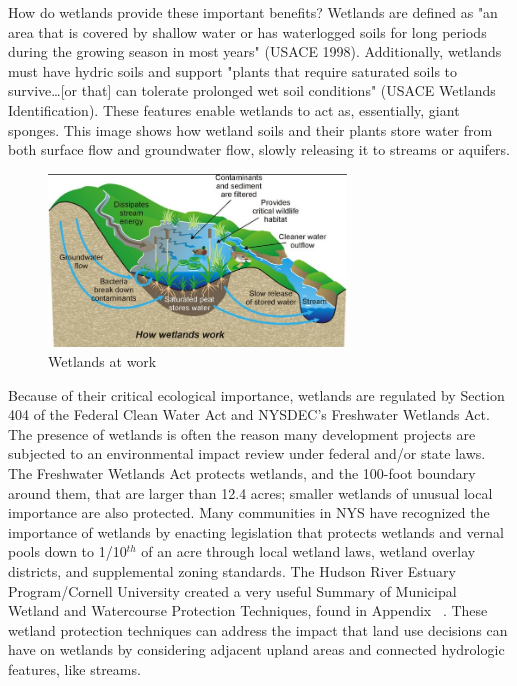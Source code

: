 How do wetlands provide these important benefits? Wetlands are defined as "an 
area that is covered by shallow water or has waterlogged soils for long periods 
during the growing season in most years" (USACE 1998). Additionally, wetlands 
must have hydric soils and support "plants that require saturated soils to 
survive\ldots [or that] can tolerate prolonged wet soil conditions" (USACE 
Wetlands Identification). These features enable wetlands to act as, 
essentially, giant sponges. This image shows how wetland soils and their plants 
store water from both surface flow and groundwater flow, slowly releasing it to 
streams or aquifers.
\begin{figure}
    \includegraphics[width=7.9cm, keepaspectratio]{images/wetlands_work.jpg}
  \caption{Wetlands at work}\label{fig:wetlands}
\end{figure}
Because of their critical ecological importance, wetlands are regulated by 
Section 404 of the Federal Clean Water Act and NYSDEC's Freshwater Wetlands 
Act. The presence of wetlands is often the reason many development projects are 
subjected to an environmental impact review under federal and/or state laws. The 
Freshwater Wetlands Act protects wetlands, and the 100-foot boundary around 
them, that are larger than 12.4 acres; smaller wetlands of unusual local 
importance are also protected. Many communities in NYS have recognized the 
importance of wetlands by enacting legislation that protects wetlands and vernal 
pools down to 1/10$^{th}$ of an acre through local wetland laws, wetland overlay 
districts, and supplemental zoning standards. The Hudson River Estuary 
Program/Cornell University created a very useful Summary of Municipal Wetland 
and Watercourse Protection Techniques, found in Appendix 
~. These wetland protection techniques can address the 
impact that land use decisions can have on wetlands by considering adjacent 
upland areas and connected hydrologic features, like streams.

